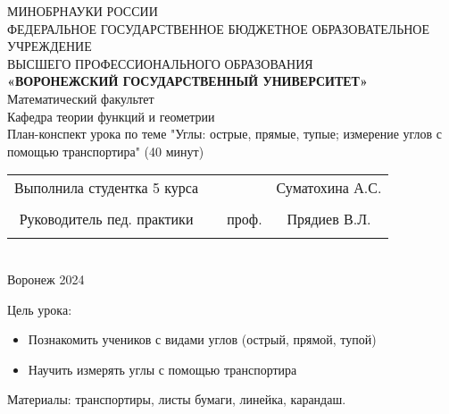 \documentclass[a4paper,12pt]{article}
\begin{document}
\begin{center}
	\hfill \break
	\large{МИНОБРНАУКИ РОССИИ}\\
	\footnotesize{ФЕДЕРАЛЬНОЕ ГОСУДАРСТВЕННОЕ БЮДЖЕТНОЕ ОБРАЗОВАТЕЛЬНОЕ УЧРЕЖДЕНИЕ}\\
	\footnotesize{ВЫСШЕГО ПРОФЕССИОНАЛЬНОГО ОБРАЗОВАНИЯ}\\
	\small{\textbf{«ВОРОНЕЖСКИЙ ГОСУДАРСТВЕННЫЙ УНИВЕРСИТЕТ»}}\\
	\hfill \break
	\normalsize{Математический факультет}\\
	\hfill \break
	\normalsize{Кафедра теории функций и геометрии}\\
	\hfill\break
	\hfill \break
	\hfill \break
	\hfill \break
	\hfill \break
	\hfill \break
	\hfill \break
	\hfill \break
	\hfill \break
	\large{План-конспект урока по теме "Углы: острые, прямые, тупые; измерение углов с помощью транспортира" (40 минут)}\\
	\hfill \break
	\hfill \break
	\hfill \break
\hfill \break
\hfill \break
\hfill \break
\hfill \break
\hfill \break
\hfill \break
\normalsize{
	\begin{tabular}{cccc}
		Выполнила студентка 5 курса & \underline{\hspace{3cm}} &                       &  Суматохина А.С. \\\\
		Руководитель пед. практики & \underline{\hspace{3cm}} & проф. & Прядиев В.Л.    \\\\
	\end{tabular}
}\\
\hfill \break
\hfill \break
\hfill \break
\hfill \break
\hfill \break
\hfill \break
\hfill \break
\hfill \break
\hfill \break
\hfill \break
\hfill \break
\hfill \break
\hfill \break
\hfill \break
\hfill \break
\hfill \break
\hfill \break
Воронеж 2024 \end{center}
\newpage

Цель урока:
\begin{itemize}
\item Познакомить учеников с видами углов (острый, прямой, тупой)
\item Научить измерять углы с помощью транспортира
\end{itemize}

Материалы: транспортиры, листы бумаги, линейка, карандаш.
\end{document}
